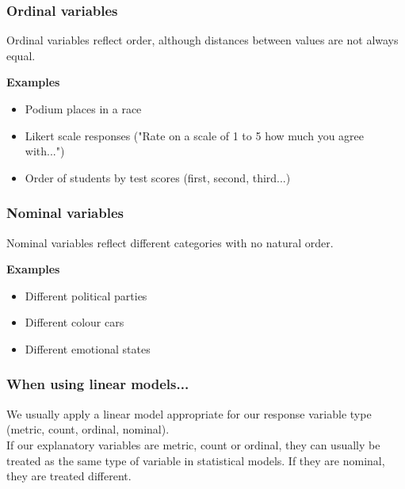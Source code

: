 \documentclass{beamer}
\begin{document}
\begin{frame}
  \frametitle{Ordinal variables}
  Ordinal variables reflect \alert{order}, although distances between values are not always equal. \\ \vspace{0.5cm}
  \begin{block}{\textbf{Examples}}
    \begin{itemize}
      \item Podium places in a race
      \item Likert scale responses ("Rate on a scale of 1 to 5 how much you agree with...")
      \item Order of students by test scores (first, second, third...)
    \end{itemize}
  \end{block}
\end{frame}
\begin{frame}
  \frametitle{Nominal variables}
  Nominal variables reflect \alert{different categories with no natural order}. \\ \vspace{0.5cm}
  \begin{block}{\textbf{Examples}}
    \begin{itemize}
      \item Different political parties
      \item Different colour cars
      \item Different emotional states
    \end{itemize}
  \end{block}
\end{frame}
\begin{frame}
  \frametitle{When using linear models...}
  We usually apply a linear model appropriate for our response variable type (metric, count, ordinal, nominal).\\
  \vspace{1cm}
  If our explanatory variables are metric, count or ordinal, they can usually be treated as the same type of variable in statistical models. If they are nominal, they are treated different.
\end{frame}
\end{document}

